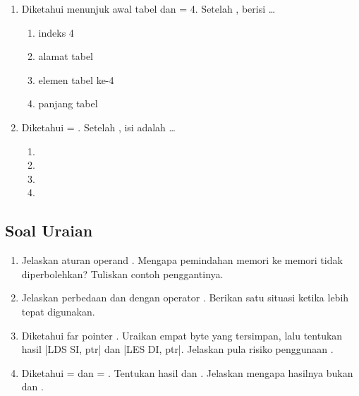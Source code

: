 \begin{enumerate}
    \item Diketahui  menunjuk awal tabel dan  = 4.
          Setelah ,  berisi \dots
          \begin{enumerate}
              \item indeks 4
              \item alamat tabel
              \item elemen tabel ke-4
              \item panjang tabel
          \end{enumerate}

    \item Diketahui  = . Setelah , isi
           adalah \dots
          \begin{enumerate}
              \item {} \item {}
              \item {} \item {}
          \end{enumerate}
\end{enumerate}

\subsection{Soal Uraian}

\begin{enumerate}
    \item Jelaskan aturan operand . Mengapa pemindahan
          memori ke memori tidak diperbolehkan? Tuliskan contoh
          penggantinya.

    \item Jelaskan perbedaan  dan  dengan
          operator . Berikan satu situasi ketika
           lebih tepat digunakan.

    \item Diketahui far pointer . Uraikan
          empat byte yang tersimpan, lalu tentukan hasil
          \lstasm|LDS SI, ptr| dan \lstasm|LES DI, ptr|. Jelaskan
          pula risiko penggunaan .

    \item Diketahui  =  dan  = .
          Tentukan hasil  dan . Jelaskan mengapa
          hasilnya bukan  dan .
\end{enumerate}

